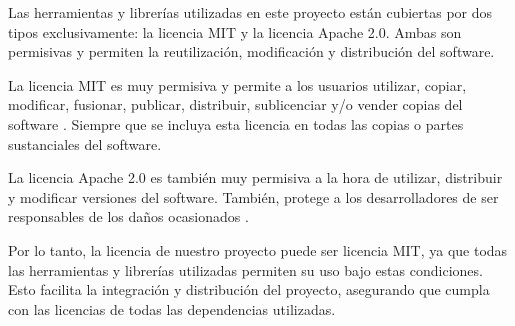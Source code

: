 Las herramientas y librerías utilizadas en este proyecto están cubiertas por dos tipos exclusivamente: la licencia MIT\cite{mit:license} y la licencia Apache 2.0\cite{apache:license}. Ambas son permisivas y permiten la reutilización, modificación y distribución del software.

La licencia MIT es muy permisiva y permite a los usuarios utilizar, copiar, modificar, fusionar, publicar, distribuir, sublicenciar y/o vender copias del software \cite{sistemasoperativos:mit}. Siempre que se incluya esta licencia en todas las copias o partes sustanciales del software.

La licencia Apache 2.0 es también muy permisiva a la hora de utilizar, distribuir y modificar versiones del software. También, protege a los desarrolladores de ser responsables de los daños ocasionados \cite{sistemasoperativos:apache}.

Por lo tanto, la licencia de nuestro proyecto puede ser licencia MIT, ya que todas las herramientas y librerías utilizadas permiten su uso bajo estas condiciones. Esto facilita la integración y distribución del proyecto, asegurando que cumpla con las licencias de todas las dependencias utilizadas.
